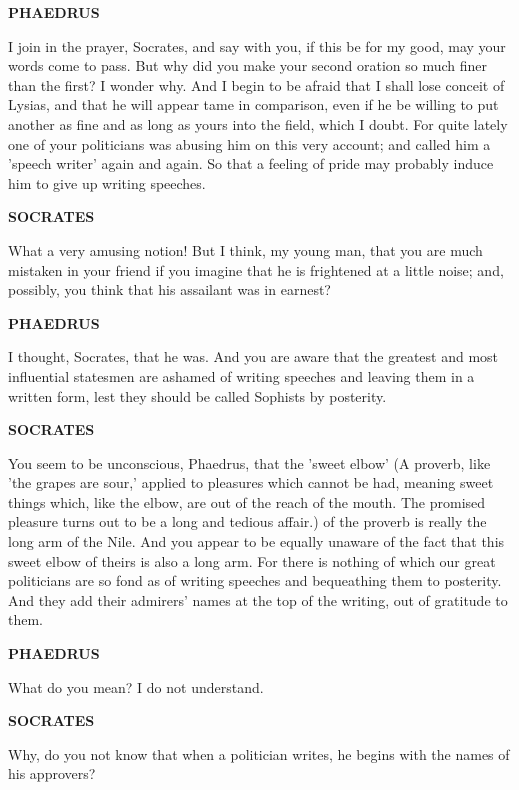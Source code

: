 \documentclass[11pt,letter]{article}
\begin{document}
\par \textbf{PHAEDRUS}
\par   I join in the prayer, Socrates, and say with you, if this be for my good, may your words come to pass. But why did you make your second oration so much finer than the first? I wonder why. And I begin to be afraid that I shall lose conceit of Lysias, and that he will appear tame in comparison, even if he be willing to put another as fine and as long as yours into the field, which I doubt. For quite lately one of your politicians was abusing him on this very account; and called him a 'speech writer' again and again. So that a feeling of pride may probably induce him to give up writing speeches.

\par \textbf{SOCRATES}
\par   What a very amusing notion! But I think, my young man, that you are much mistaken in your friend if you imagine that he is frightened at a little noise; and, possibly, you think that his assailant was in earnest?

\par \textbf{PHAEDRUS}
\par   I thought, Socrates, that he was. And you are aware that the greatest and most influential statesmen are ashamed of writing speeches and leaving them in a written form, lest they should be called Sophists by posterity.

\par \textbf{SOCRATES}
\par   You seem to be unconscious, Phaedrus, that the 'sweet elbow' (A proverb, like 'the grapes are sour,' applied to pleasures which cannot be had, meaning sweet things which, like the elbow, are out of the reach of the mouth. The promised pleasure turns out to be a long and tedious affair.) of the proverb is really the long arm of the Nile. And you appear to be equally unaware of the fact that this sweet elbow of theirs is also a long arm. For there is nothing of which our great politicians are so fond as of writing speeches and bequeathing them to posterity. And they add their admirers' names at the top of the writing, out of gratitude to them.

\par \textbf{PHAEDRUS}
\par   What do you mean? I do not understand.

\par \textbf{SOCRATES}
\par   Why, do you not know that when a politician writes, he begins with the names of his approvers?
\end{document}
